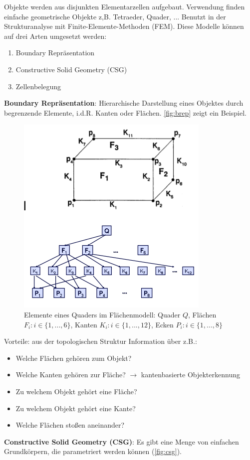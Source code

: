  Objekte werden aus disjunkten Elementarzellen aufgebaut. Verwendung finden einfache geometrische Objekte z,B. Tetraeder, Quader, ...
Benutzt in der Strukturanalyse mit Finite-Elemente-Methoden (FEM).
\newpage
Diese Modelle können auf drei Arten umgesetzt werden:
\begin{enumerate}
\item Boundary Repräsentation
\item Constructive Solid Geometry (CSG)
\item Zellenbelegung
\end{enumerate}
\textbf{Boundary Repräsentation}: Hierarchische Darstellung eines Objektes durch begrenzende
Elemente, i.d.R. Kanten oder Flächen. \autoref{fig:brep} zeigt ein Beispiel.\\
\begin{figure}[h!]
	\centering 
	\includegraphics[width=0.3\linewidth]{figures/ch02_brep.png}
	\caption{Elemente eines Quaders im Flächenmodell: Quader $Q$, Flächen $F_i : i \in \{1,...,6\}$, Kanten $K_i : i \in \{1,...,12\}$, Ecken $P_i : i \in \{1,...,8\}$}
\label{fig:brep}
\end{figure}
Vorteile: aus der topologischen Struktur Information über z.B.:
\begin{itemize}
\item Welche Flächen gehören zum Objekt?
\item Welche Kanten gehören zur Fläche? $\rightarrow$ kantenbasierte Objekterkennung
\item Zu welchem Objekt gehört eine Fläche?
\item Zu welchem Objekt gehört eine Kante?
\item Welche Flächen stoßen aneinander?
\end{itemize}
\noindent
\textbf{Constructive Solid Geometry (CSG)}:
Es gibt eine Menge von einfachen Grundkörpern, die parametriert
werden können (\autoref{fig:csg}). 
